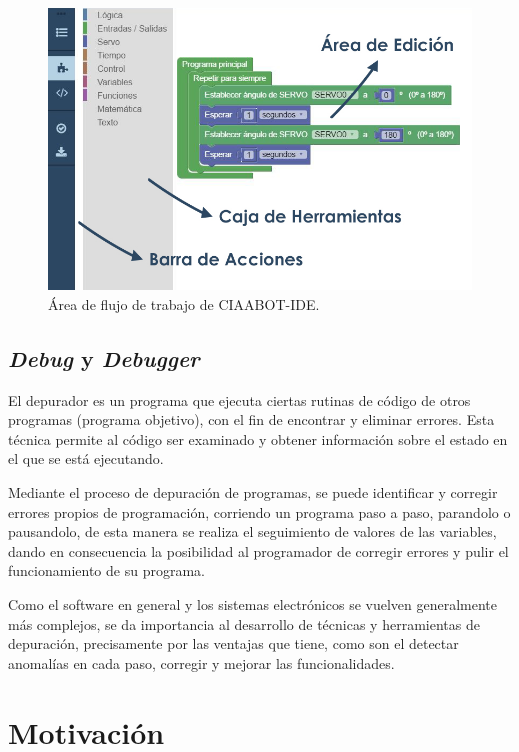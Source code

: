 \begin{figure}[h]
	\centering
	\includegraphics[scale=.50]{./Figures/editor.PNG}
	\caption{Área de flujo de trabajo de CIAABOT-IDE.}
	\label{fig:editor}
\end{figure}

\subsection{\emph{Debug} y \emph{Debugger}}
\label{Debug y Debugger}

El depurador es un programa que ejecuta ciertas rutinas de código de otros programas (programa objetivo), con el fin de encontrar y eliminar errores. Esta técnica permite al código ser examinado y obtener información sobre el estado en el que se está ejecutando.

Mediante el proceso de depuración de programas, se puede identificar y corregir errores propios de programación, corriendo un programa paso a paso, parandolo o pausandolo, de esta manera se realiza el seguimiento de
valores de las variables, dando en consecuencia la posibilidad al programador
de corregir errores y pulir el funcionamiento de su programa.

Como el software en general y los sistemas electrónicos se vuelven generalmente
más complejos, se da importancia al desarrollo de técnicas y herramientas de depuración,
precisamente por las ventajas que tiene, como son el detectar anomalías
en cada paso, corregir y mejorar las funcionalidades. 


\section{Motivación}
\label{Motivación}

